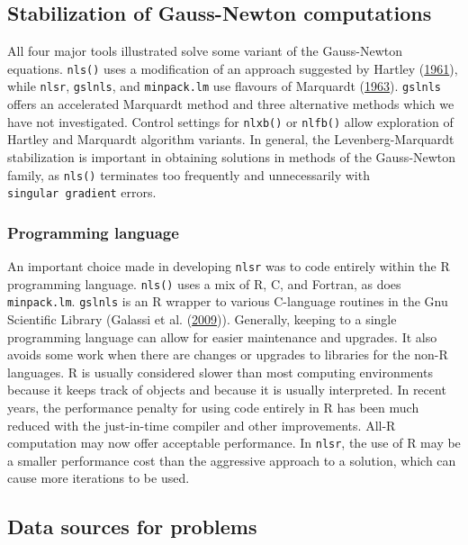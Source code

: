 \documentclass[
]{article}
\begin{document}
\hypertarget{stabilization-of-gauss-newton-computations}{%
\subsection{Stabilization of Gauss-Newton
computations}\label{stabilization-of-gauss-newton-computations}}

All four major tools illustrated solve some variant of the Gauss-Newton
equations. \texttt{nls()} uses a modification of an approach suggested
by Hartley (\protect\hyperlink{ref-Hartley1961}{1961}), while
\texttt{nlsr}, \texttt{gslnls}, and \texttt{minpack.lm} use flavours of
Marquardt (\protect\hyperlink{ref-Marquardt1963}{1963}). \texttt{gslnls}
offers an accelerated Marquardt method and three alternative methods
which we have not investigated. Control settings for \texttt{nlxb()} or
\texttt{nlfb()} allow exploration of Hartley and Marquardt algorithm
variants. In general, the Levenberg-Marquardt stabilization is important
in obtaining solutions in methods of the Gauss-Newton family, as
\texttt{nls()} terminates too frequently and unnecessarily with
\texttt{singular\ gradient} errors.

\hypertarget{programming-language}{%
\subsubsection{Programming language}\label{programming-language}}

An important choice made in developing \texttt{nlsr} was to code
entirely within the R programming language. \texttt{nls()} uses a mix of
R, C, and Fortran, as does \texttt{minpack.lm}. \texttt{gslnls} is an R
wrapper to various C-language routines in the Gnu Scientific Library
(Galassi et al. (\protect\hyperlink{ref-GSL-manual}{2009})). Generally,
keeping to a single programming language can allow for easier
maintenance and upgrades. It also avoids some work when there are
changes or upgrades to libraries for the non-R languages. R is usually
considered slower than most computing environments because it keeps
track of objects and because it is usually interpreted. In recent years,
the performance penalty for using code entirely in R has been much
reduced with the just-in-time compiler and other improvements. All-R
computation may now offer acceptable performance. In \texttt{nlsr}, the
use of R may be a smaller performance cost than the aggressive approach
to a solution, which can cause more iterations to be used.

\hypertarget{data-sources-for-problems}{%
\subsection{Data sources for problems}\label{data-sources-for-problems}}
\end{document}
